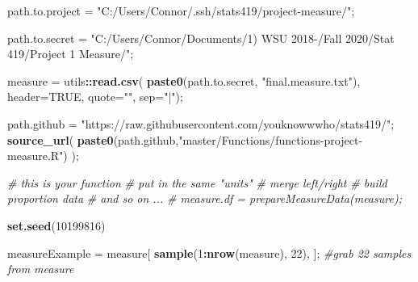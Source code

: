 \documentclass[]{article}
\newenvironment{Shaded}{\begin{snugshade}}{\end{snugshade}}
\newcommand{\CommentTok}[1]{\textcolor[rgb]{0.56,0.35,0.01}{\textit{#1}}}
\newcommand{\DataTypeTok}[1]{\textcolor[rgb]{0.13,0.29,0.53}{#1}}
\newcommand{\DecValTok}[1]{\textcolor[rgb]{0.00,0.00,0.81}{#1}}
\newcommand{\KeywordTok}[1]{\textcolor[rgb]{0.13,0.29,0.53}{\textbf{#1}}}
\newcommand{\NormalTok}[1]{#1}
\newcommand{\OperatorTok}[1]{\textcolor[rgb]{0.81,0.36,0.00}{\textbf{#1}}}
\newcommand{\OtherTok}[1]{\textcolor[rgb]{0.56,0.35,0.01}{#1}}
\newcommand{\StringTok}[1]{\textcolor[rgb]{0.31,0.60,0.02}{#1}}
\begin{document}
\begin{Shaded}
\begin{Highlighting}[]
\NormalTok{path.to.project =}\StringTok{ "C:/Users/Connor/.ssh/stats419/project-measure/"}\NormalTok{;}

\NormalTok{path.to.secret =}\StringTok{ "C:/Users/Connor/Documents/1) WSU 2018-/Fall 2020/Stat 419/Project 1 Measure/"}\NormalTok{;}

\NormalTok{measure =}\StringTok{ }\NormalTok{utils}\OperatorTok{::}\KeywordTok{read.csv}\NormalTok{( }\KeywordTok{paste0}\NormalTok{(path.to.secret, }\StringTok{"final.measure.txt"}\NormalTok{), }\DataTypeTok{header=}\OtherTok{TRUE}\NormalTok{, }
                          \DataTypeTok{quote=}\StringTok{""}\NormalTok{, }\DataTypeTok{sep=}\StringTok{"|"}\NormalTok{);}

\NormalTok{path.github =}\StringTok{ "https://raw.githubusercontent.com/youknowwwho/stats419/"}\NormalTok{;}
\KeywordTok{source_url}\NormalTok{( }\KeywordTok{paste0}\NormalTok{(path.github,}\StringTok{"master/Functions/functions-project-measure.R"}\NormalTok{) );}

\CommentTok{# this is your function}
\CommentTok{# put in the same "units"}
\CommentTok{# merge left/right}
\CommentTok{# build proportion data}
\CommentTok{# and so on ... }
\CommentTok{# measure.df = prepareMeasureData(measure);}

\KeywordTok{set.seed}\NormalTok{(}\DecValTok{10199816}\NormalTok{)}

\NormalTok{measureExample =}\StringTok{ }\NormalTok{measure[ }\KeywordTok{sample}\NormalTok{(}\DecValTok{1}\OperatorTok{:}\KeywordTok{nrow}\NormalTok{(measure), }\DecValTok{22}\NormalTok{), ]; }\CommentTok{#grab 22 samples from measure}


\end{Highlighting}
\end{Shaded}
\end{document}
